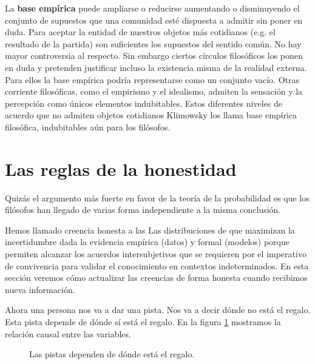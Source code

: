 \documentclass[a4paper,10pt]{book}
\begin{document}

La \textbf{base empírica} puede ampliarse o reducirse aumentando o disminuyendo el conjunto de supuestos que una comunidad esté dispuesta a admitir sin poner en duda.
Para aceptar la entidad de nuestros objetos más cotidianos (e.g. el resultado de la partida) son suficientes los supuestos del sentido común.
No hay mayor controversia al respecto.
Sin embargo ciertos círculos filosóficos los ponen en duda y pretenden justificar incluso la existencia misma de la
realidad externa. Para ellos la base empírica podría representarse como un conjunto vacío. Otras
corriente filosóficas, como el empirismo y el idealismo, admiten la sensación y la percepción como
únicos elementos indubitables. Estos diferentes niveles de acuerdo que no admiten objetos
cotidianos Klimowsky los llama base empírica filosófica, indubitables aún para los filósofos.


\section{Las reglas de la honestidad}

Quizás el argumento más fuerte en favor de la teoría de la probabilidad es que los filósofos han llegado de varias forma independiente a la misma conclusión.



Hemos llamado creencia honesta a las Las distribuciones de que maximizan la incertidumbre dada la evidencia empírica (datos) y formal (modelos) porque permiten alcanzar los acuerdos intersubjetivos que se requieren por el imperativo de convivencia para validar el conocimiento en contextos indeterminados.
En esta sección veremos cómo actualizar las creencias de forma honesta cuando recibimos nueva información.


Ahora una persona nos va a dar una pista.
Nos va a decir dónde no está el regalo.
Esta pista depende de dónde sí está el regalo.
En la figura \ref{fig:modelo_causal_base} mostramos la relación causal entre las variables.
\begin{figure}[H]     
 \centering
  \caption{Las pistas dependen de dónde está el regalo.}
  \label{fig:modelo_causal_base}
\end{figure}
\end{document}
